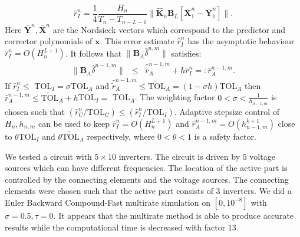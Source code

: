 \documentclass{report}
\begin{document}
\begin{equation}
\hat{r}_I^{n} = \frac{1}{4}\frac{H_n}{T_n - T_{n-L-1}}
\|\hat{\mathbf{K}}_{n}\mathbf{B}_L\left[\bar{\mathbf{X}}_{1}^n-\bar{\mathbf{Y}}_{1}^n\right]
\|.
\end{equation}
Here $\bar{\mathbf{Y}}^n,\bar{\mathbf{X}}^n$ are the Nordsieck vectors
which correspond to the predictor and corrector polynomials of $\mathbf{x}$.
This error estimate $\hat{r}_I^n$ has the asymptotic behaviour
$\hat{r}_I^{n} = O(H_n^{L+1})$.
It follows that
$\|\mathbf{B}_A\hat{\delta}^{n,m}\|$ satisfies:
\begin{equation}\begin{array}{rcl}
\|\mathbf{B}_A\hat{\delta}^{n-1,m}\| &\leq& \hat{\tilde{r}}_A^{n-1,m} +
h\hat{r}_I^{n} =: \hat{r}_A^{n-1,m}.
\end{array}\end{equation}
If $\hat{r}_I^{n} \leq $ TOL$_I = \sigma$TOL$_A$ and
$\hat{\tilde{r}}_A^{n-1,m} \leq \tilde{\mbox{TOL}}_A = (1-\sigma h)$TOL$_A$
then $\hat{r}_A^{n-1,m} \leq \tilde{\mbox{TOL}}_A + h$TOL$_I =$ TOL$_A$.
The weighting factor
$0 < \sigma < \frac{1}{h_{n-1,m}}$ is chosen such that
$(\hat r_C^n/\mbox{TOL}_C) \leq (\hat{r}_I^{n}/\mbox{TOL}_I)$.
Adaptive stepsize control of $H_n,h_{n,m}$ can be used to keep
$\hat{r}_I^{n}=O(H_n^{L+1})$ and $\hat{r}_A^{n-1,m}= O(h_{n-1,m}^{k+1})$
close to
$\theta \mbox{TOL}_I$ and $\theta \tilde{\mbox{TOL}}_A$ respectively,
where $0<\theta<1$ is a safety factor.

We tested a circuit with $5 \times 10$ inverters. The circuit is driven
by $5$ voltage sources which can have
different frequencies. The location of the active part is controlled by the connecting
elements and the voltage sources. The connecting elements were chosen such that
the active part consists of 3 inverters.
We did a Euler Backward Compound-Fast multirate simulation on
$[0,10^{-8}]$ with $\sigma = 0.5,\tau = 0$. It appears that the multirate
method is able to produce accurate results while the computational time
is decreased with factor 13.
\end{document}
